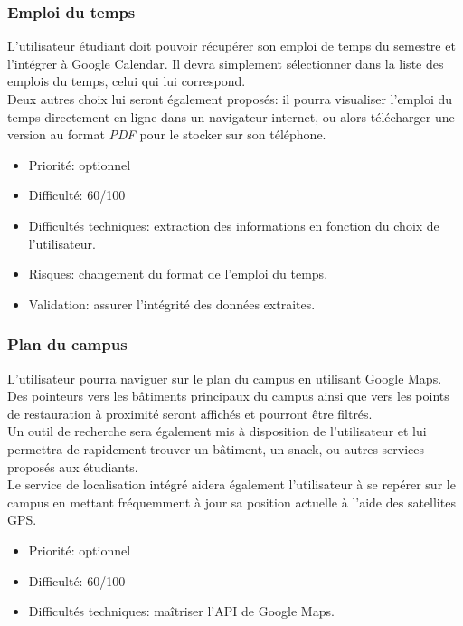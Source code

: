 \subsubsection{Emploi du temps}
L'utilisateur étudiant doit pouvoir récupérer son emploi de temps du semestre et l'intégrer à Google Calendar. Il devra simplement sélectionner dans la liste des emplois du temps, celui qui lui correspond. \\
Deux autres choix lui seront également proposés: il pourra visualiser l'emploi du temps directement en ligne dans un navigateur internet, ou alors télécharger une version au format \textit{PDF} pour le stocker sur son téléphone.

\begin{itemize}
\renewcommand{\labelitemi}{$\bullet$}
\item Priorité: optionnel
\item Difficulté: 60/100
\item Difficultés techniques: extraction des informations en fonction du choix de l'utilisateur.
\item Risques: changement du format de l'emploi du temps.
\item Validation: assurer l'intégrité des données extraites.
\end{itemize}

\subsubsection{Plan du campus}
L'utilisateur pourra naviguer sur le plan du campus en utilisant Google Maps. Des pointeurs vers les bâtiments principaux du campus ainsi que vers les points de restauration à proximité seront affichés et pourront être filtrés. \\
Un outil de recherche sera également mis à disposition de l'utilisateur et lui permettra de rapidement trouver un bâtiment, un snack, ou autres services proposés aux étudiants. \\
Le service de localisation intégré aidera également l'utilisateur à se repérer sur le campus en mettant fréquemment à jour sa position actuelle à l'aide des satellites GPS.

\begin{itemize}
\renewcommand{\labelitemi}{$\bullet$}
\item Priorité: optionnel
\item Difficulté: 60/100
\item Difficultés techniques: maîtriser l'API de Google Maps.
\end{itemize}



